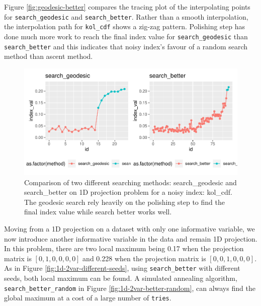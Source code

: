 \documentclass[12pt]{article}
\begin{document}
Figure \ref{fig:geodesic-better} compares the tracing plot of the
interpolating points for \texttt{search\_geodesic} and
\texttt{search\_better}. Rather than a smooth interpolation, the
interpolation path for \texttt{kol\_cdf} shows a zig-zag pattern.
Polishing step has done much more work to reach the final index value
for \texttt{search\_geodesic} than \texttt{search\_better} and this
indicates that noisy index's favour of a random search method than
ascent method.

\begin{figure}
\centering
\includegraphics{paper_files/figure-latex/geodesic-better-1.pdf}
\caption{Comparison of two different searching methods: search\_geodesic
and search\_better on 1D projection problem for a noisy index: kol\_cdf.
The geodesic search rely heavily on the polishing step to find the final
index value while search better works well.}
\end{figure}

Moving from a 1D projection on a dataset with only one informative
variable, we now introduce another informative variable in the data and
remain 1D projection. In this problem, there are two local maximum being
0.17 when the projection matrix is \([0, 1, 0, 0, 0, 0]\) and 0.228 when
the projection matrix is \([0, 0, 1 ,0, 0, 0]\). As in Figure
\ref{fig:1d-2var-different-seeds}, using \texttt{search\_better} with
different seeds, both local maximum can be found. A simulated annealing
algorithm, \texttt{search\_better\_random} in Figure
\ref{fig:1d-2var-better-random}, can always find the global maximum at a
cost of a large number of \texttt{tries}.
\end{document}
